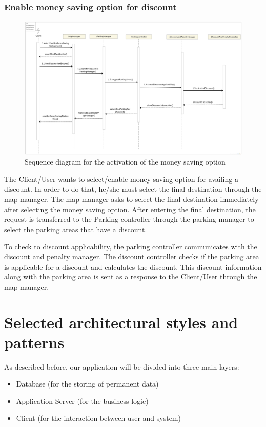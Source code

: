 \subsubsection{Enable money saving option for discount}
\begin{figure}[t]
	\centering
	\includegraphics[width=\linewidth,keepaspectratio]{figures/money_saving_option_runtime.eps}
	\caption{Sequence diagram for the activation of the money saving option}
	\label{fig:money_saving_option_runtime}
\end{figure}

The Client/User wants to select/enable money saving option for availing a discount. In order to do that, he/she must select the final destination through the map manager. The map manager asks to select the final destination immediately after selecting the money saving option. After entering the final destination, the request is transferred to the Parking controller through the parking manager to select the parking areas that have a discount.

To check to discount applicability, the parking controller communicates with the discount and penalty manager. The discount controller checks if the parking area is applicable for a discount and calculates the discount. This discount information along with the parking area is sent as a response to the Client/User through the map manager.

\section{Selected architectural styles and patterns}
As described before, our application will be divided into three main layers:
\begin{itemize}
	\item Database (for the storing of permanent data)
	\item Application Server (for the business logic)
	\item Client (for the interaction between user and system)
\end{itemize}

